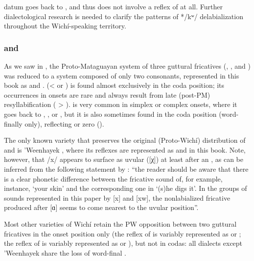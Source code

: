datum goes back to , and thus does not involve a reflex of  at all. Further dialectological research is needed to clarify the patterns of */kʷ/ delabialization throughout the Wichí-speaking territory.

\subsubsection{ and } \label{wi-jj-h}

As we saw in , the Proto-Mataguayan system of three guttural fricatives (, , and ) was reduced to a system composed of only two consonants, represented in this book as  and .  (<  or ) is found almost exclusively in the coda position; its occurrences in onsets are rare and always result from late (post-PM) resyllabification ( > ).  is very common in simplex or complex onsets, where it goes back to , , or , but it is also sometimes found in the coda position (word-finally only), reflecting  or zero ().

The only known variety that preserves the original (Proto-Wichí) distribution of  and  is 'Weenhayek \citep[19--25]{KC94}, where its reflexes are represented as  and  in this book. Note, however, that /x/ appears to surface as uvular ([χ]) at least after an , as can be inferred from the following statement by \citet[19--20, fn. 23]{KC94}: ``the reader should be aware that there is a clear phonetic difference between the fricative sound of, for example, instance,    `your skin' and the corresponding one in   `(s)he digs it'. In the groups of
sounds represented in this paper by [x] and [xw], the nonlabialized fricative produced after [ɑ] seems to come nearest to the uvular position''.

Most other varieties of Wichí retain the PW opposition between two guttural fricatives in the onset position only (the reflex of  is variably represented as  or ; the reflex of  is variably represented as  or ), but not in codas: all dialects except 'Weenhayek share the loss of word-final .

